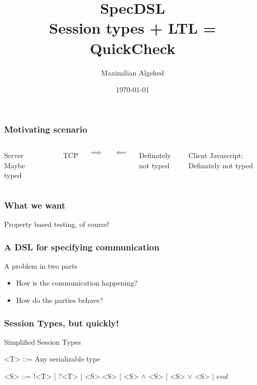 \documentclass{beamer}
\title[SpecDSL]{SpecDSL \\ \large{Session types + LTL = QuickCheck}}
\author{Maximilian Algehed} %
\institute[CTH] %
{
Chalmers University of Technology \\ %
\medskip
\textit{m.algehed@gmail.com} %
}
\date{\today} %
\begin{document}
\begin{frame}
    \titlepage %
\end{frame}

\begin{frame}
    \frametitle{Motivating scenario}
    \begin{columns}
        \begin{block}{Server}
            \small{Maybe typed}
        \end{block}

        \\
        \centerline{TCP}
        \centerline{\Large{$\implies$}}
        \centerline{\Large{$\impliedby$}}
        \centerline{Definately not typed}

        \begin{block}{Client}
            \small{Javascript: Definately not typed}
        \end{block}
        
    \end{columns}
\end{frame}

\begin{frame}
    \frametitle{What we want}
    \centering
    \Large{Property based testing, of course!}
\end{frame}

\begin{frame}
    \frametitle{A DSL for specifying communication}
    \centering
    \Large{A problem in two parts}
    \begin{itemize}
        \item How is the communication happening?
        \item How do the parties behave?
    \end{itemize}
\end{frame}

\begin{frame}[fragile]
    \frametitle{Session Types, but quickly!}
    \large{Simplified Session Types}
    \\
    \begin{grammar}
        <T> ::= Any serializable type

        <S> ::= !<T> | ?<T> | <S>.<S> | <S> $\wedge$ <S> | <S> $\vee$ <S> | $end$
    \end{grammar}
\end{frame}
\end{document}
